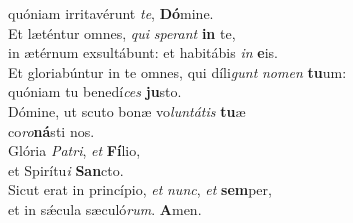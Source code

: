 \evenverse quóniam irritavérunt \textit{te}, \textbf{Dó}mine.\\
\oddverse Et læténtur omnes, \textit{qui} \textit{spe}\textit{rant} \textbf{in} te,~\*\\
\oddverse in ætérnum exsultábunt: et habitábis \textit{in} \textbf{e}is.\\
\evenverse Et gloriabúntur in te omnes, qui díli\textit{gunt} \textit{no}\textit{men} \textbf{tu}um:~\*\\
\evenverse quóniam tu benedí\textit{ces} \textbf{ju}sto.\\
\oddverse Dómine, ut scuto bonæ vo\textit{lun}\textit{tá}\textit{tis} \textbf{tu}æ~\*\\
\oddverse co\textit{ro}\textbf{ná}sti nos.\\
\evenverse Glória \textit{Pa}\textit{tri}, \textit{et} \textbf{Fí}lio,~\*\\
\evenverse et Spirítu\textit{i} \textbf{San}cto.\\
\oddverse Sicut erat in princípio, \textit{et} \textit{nunc}, \textit{et} \textbf{sem}per,~\*\\
\oddverse et in sǽcula sæculó\textit{rum}. \textbf{A}men.\\
